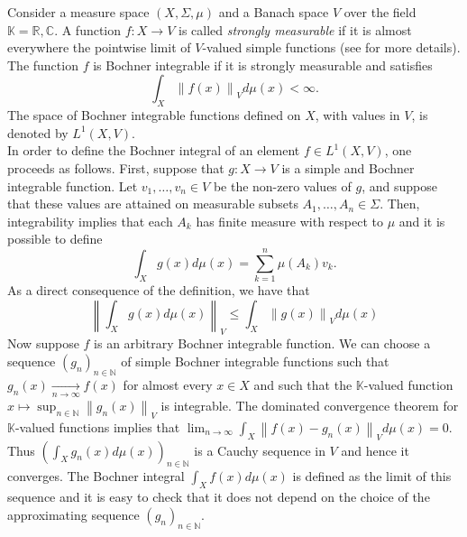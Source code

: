 \documentclass{amsart}
\theoremstyle{definition}
\theoremstyle{plain}
\newcommand{\K}{\mathbb{K}}
\newcommand{\R}{\mathbb{R}}
\newcommand{\N}{\mathbb{N}}
\newcommand{\C}{\mathbb{C}}
\newcommand{\norm}[1]{\left\lVert #1\right\rVert} %
\begin{document}
        Consider a measure space $(X,\Sigma,\mu)$ and a Banach space $V$ over the field $\K = \R,\C$. 
        A function $f \colon X \rightarrow V$ is called \emph{strongly measurable} if it is almost everywhere the pointwise limit of $V$-valued simple functions (see \cite{Cohn2013} for more details). 
        The function $f$ is Bochner integrable if it is strongly measurable and satisfies
        \begin{equation*}
            \int_X \norm{f(x)}_V d\mu(x) < \infty.
        \end{equation*}
        The space of Bochner integrable functions defined on $X$, with values in $V$, is denoted by $L^1(X,V)$. \\
        In order to define the Bochner integral of an element $f \in L^1(X,V)$, one proceeds as follows.
        First, suppose that $g \colon X \rightarrow V$ is a simple and Bochner integrable function. 
        Let $v_1,\dots,v_n \in V$ be the non-zero values of $g$, and suppose that these values are attained on measurable subsets $A_1,\dots,A_n \in \Sigma$. 
        Then, integrability implies that each $A_k$ has finite measure with respect to $\mu$ and it is possible to define        
        \begin{equation*}
            \int_X g(x) d\mu(x) = \sum_{k=1}^n \mu(A_k) v_k.
        \end{equation*}
        As a direct consequence of the definition, we have that
        \begin{equation*}
            \norm{\int_X g(x) d\mu(x)}_V \leq \int_X \norm{g(x)}_V d\mu(x)
        \end{equation*}
        Now suppose $f$ is an arbitrary Bochner integrable function.
        We can choose a sequence $(g_n)_{n \in \N}$ of simple Bochner integrable functions such that $g_n(x) \xrightarrow[n \rightarrow \infty]{} f(x)$ for almost every $x \in X$ and such that the $\K$-valued function $x \mapsto \sup_{n \in \N}\norm{g_n(x)}_V$ is integrable.
        The dominated convergence theorem for $\K$-valued functions implies that $\lim_{n \rightarrow \infty}\int_X \norm{f(x) - g_n(x)}_V d\mu(x) = 0$.
        Thus $\left( \int_X g_n(x) d\mu(x) \right)_{n \in \N}$ is a Cauchy sequence in $V$ and hence it converges.
        The Bochner integral $\int_X f(x) d\mu(x)$ is defined as the limit of this sequence and it is easy to check that it does not depend on the choice of the approximating sequence $(g_n)_{n \in \N}$.
\end{document}
